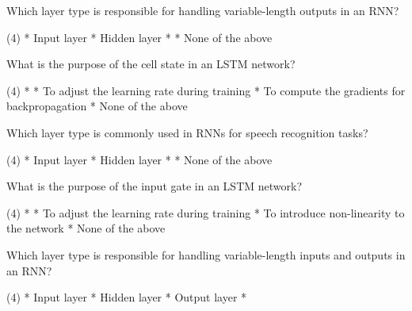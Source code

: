 \documentclass[10pt]{extarticle}
\begin{document}
\begin{exercise}
    Which layer type is responsible for handling variable-length outputs in an RNN?
    \begin{choice} (4)
        * Input layer
        * Hidden layer
        * 
        * None of the above
    \end{choice}
\end{exercise}
\begin{solution}
\end{solution}

\begin{exercise}
    What is the purpose of the cell state in an LSTM network?
    \begin{choice} (4)
        * 
        * To adjust the learning rate during training
        * To compute the gradients for backpropagation
        * None of the above
    \end{choice}
\end{exercise}
\begin{solution}
\end{solution}

\begin{exercise}
    Which layer type is commonly used in RNNs for speech recognition tasks?
    \begin{choice} (4)
        * Input layer
        * Hidden layer
        * 
        * None of the above
    \end{choice}
\end{exercise}
\begin{solution}
\end{solution}

\begin{exercise}
    What is the purpose of the input gate in an LSTM network?
    \begin{choice} (4)
        * 
        * To adjust the learning rate during training
        * To introduce non-linearity to the network
        * None of the above
    \end{choice}
\end{exercise}
\begin{solution}
\end{solution}

\begin{exercise}
    Which layer type is responsible for handling variable-length inputs and outputs in an RNN?
    \begin{choice} (4)
        * Input layer
        * Hidden layer
        * Output layer
        * 
    \end{choice}
\end{exercise}
\begin{solution}
\end{solution}
\end{document}
